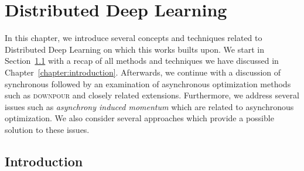 %
%
%

\chapter{Distributed Deep Learning}
\label{chapter:distributed_deep_learning}

In this chapter, we introduce several concepts and techniques related to Distributed Deep Learning on which this works builts upon. We start in Section~\ref{sec:ddl_introduction} with a recap of all methods and techniques we have discussed in Chapter~\ref{chapter:introduction}. Afterwards, we continue with a discussion of synchronous followed by an examination of asynchronous optimization methods such as \textsc{downpour} and closely related extensions. Furthermore, we address several issues such as \emph{asynchrony induced momentum} which are related to asynchronous optimization. We also consider several approaches which provide a possible solution to these issues.

\section{Introduction}
\label{sec:ddl_introduction}

